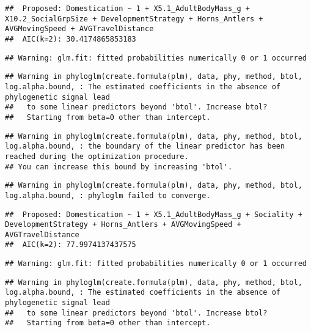 \documentclass[
]{article}
\begin{document}
\begin{verbatim}
##  Proposed: Domestication ~ 1 + X5.1_AdultBodyMass_g + X10.2_SocialGrpSize + DevelopmentStrategy + Horns_Antlers + AVGMovingSpeed + AVGTravelDistance
##  AIC(k=2): 30.4174865853183
\end{verbatim}

\begin{verbatim}
## Warning: glm.fit: fitted probabilities numerically 0 or 1 occurred
\end{verbatim}

\begin{verbatim}
## Warning in phyloglm(create.formula(plm), data, phy, method, btol, log.alpha.bound, : The estimated coefficients in the absence of phylogenetic signal lead
##   to some linear predictors beyond 'btol'. Increase btol?
##   Starting from beta=0 other than intercept.
\end{verbatim}

\begin{verbatim}
## Warning in phyloglm(create.formula(plm), data, phy, method, btol, log.alpha.bound, : the boundary of the linear predictor has been reached during the optimization procedure.
## You can increase this bound by increasing 'btol'.
\end{verbatim}

\begin{verbatim}
## Warning in phyloglm(create.formula(plm), data, phy, method, btol, log.alpha.bound, : phyloglm failed to converge.
\end{verbatim}

\begin{verbatim}
##  Proposed: Domestication ~ 1 + X5.1_AdultBodyMass_g + Sociality + DevelopmentStrategy + Horns_Antlers + AVGMovingSpeed + AVGTravelDistance
##  AIC(k=2): 77.9974137437575
\end{verbatim}

\begin{verbatim}
## Warning: glm.fit: fitted probabilities numerically 0 or 1 occurred
\end{verbatim}

\begin{verbatim}
## Warning in phyloglm(create.formula(plm), data, phy, method, btol, log.alpha.bound, : The estimated coefficients in the absence of phylogenetic signal lead
##   to some linear predictors beyond 'btol'. Increase btol?
##   Starting from beta=0 other than intercept.
\end{verbatim}
\end{document}
